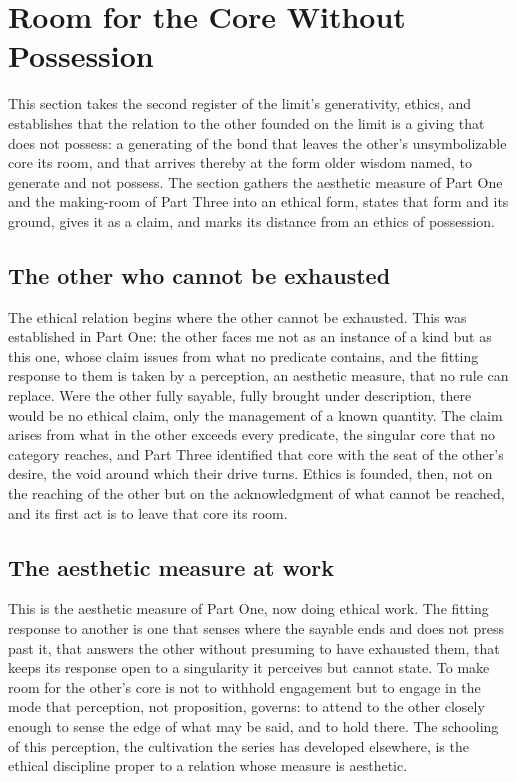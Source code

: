 \section{Room for the Core Without Possession}
\label{p26:sec:ethicsgen}

\noindent
This section takes the second register of the limit's generativity, ethics, and establishes that the relation to the other founded on the limit is a giving that does not possess: a generating of the bond that leaves the other's unsymbolizable core its room, and that arrives thereby at the form older wisdom named, to generate and not possess. The section gathers the aesthetic measure of Part One and the making-room of Part Three into an ethical form, states that form and its ground, gives it as a claim, and marks its distance from an ethics of possession.

\subsection*{The other who cannot be exhausted}

The ethical relation begins where the other cannot be exhausted. This was established in Part One: the other faces me not as an instance of a kind but as this one, whose claim issues from what no predicate contains, and the fitting response to them is taken by a perception, an aesthetic measure, that no rule can replace. Were the other fully sayable, fully brought under description, there would be no ethical claim, only the management of a known quantity. The claim arises from what in the other exceeds every predicate, the singular core that no category reaches, and Part Three identified that core with the seat of the other's desire, the void around which their drive turns. Ethics is founded, then, not on the reaching of the other but on the acknowledgment of what cannot be reached, and its first act is to leave that core its room.

\subsection*{The aesthetic measure at work}

This is the aesthetic measure of Part One, now doing ethical work. The fitting response to another is one that senses where the sayable ends and does not press past it, that answers the other without presuming to have exhausted them, that keeps its response open to a singularity it perceives but cannot state. To make room for the other's core is not to withhold engagement but to engage in the mode that perception, not proposition, governs: to attend to the other closely enough to sense the edge of what may be said, and to hold there. The schooling of this perception, the cultivation the series has developed elsewhere, is the ethical discipline proper to a relation whose measure is aesthetic.

